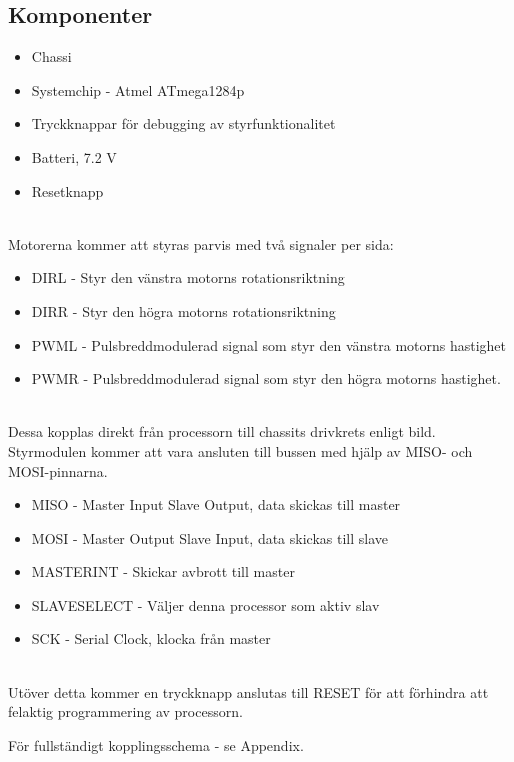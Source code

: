 \documentclass[a4paper,12pt,fleqn]{article}
\begin{document}

\subsection{Komponenter}
\begin{itemize}
	\item Chassi
	\item Systemchip - Atmel ATmega1284p
	\item Tryckknappar för debugging av styrfunktionalitet
	\item Batteri, 7.2 V
	\item Resetknapp
\end{itemize}
~\\
Motorerna kommer att styras parvis med två signaler per sida:
\begin{itemize}
	\item DIRL - Styr den vänstra motorns rotationsriktning
	\item DIRR - Styr den högra motorns rotationsriktning
	\item PWML - Pulsbreddmodulerad signal som styr den vänstra motorns hastighet
	\item PWMR - Pulsbreddmodulerad signal som styr den högra motorns hastighet.
\end{itemize}
~\\
Dessa kopplas direkt från processorn till chassits drivkrets enligt bild.
Styrmodulen kommer att vara ansluten till bussen med hjälp av MISO- och MOSI-pinnarna.

\begin{itemize}
	\item MISO - Master Input Slave Output, data skickas till master
	\item MOSI - Master Output Slave Input, data skickas till slave
	\item MASTERINT - Skickar avbrott till master
	\item SLAVESELECT - Väljer denna processor som aktiv slav
	\item SCK - Serial Clock, klocka från master
\end{itemize}
~\\
Utöver detta kommer en tryckknapp anslutas till RESET för att förhindra att felaktig programmering av processorn. 

För fullständigt kopplingsschema - se Appendix. 

\newpage
\end{document}
